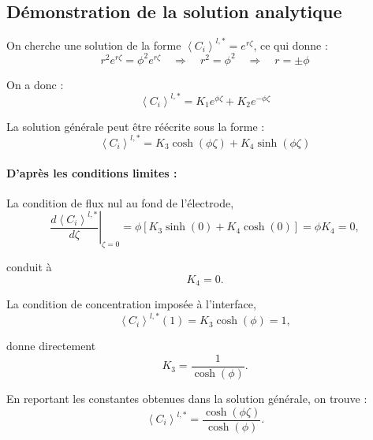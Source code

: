 \subsection*{Démonstration de la solution analytique}

On cherche une solution de la forme $\left\langle C_i \right\rangle^{l,*} = e^{r\zeta}$, ce qui donne :
\begin{equation*}
r^2 e^{r\zeta} = \phi^2 e^{r\zeta} \quad \Rightarrow \quad r^2 = \phi^2 \quad \Rightarrow \quad r = \pm\phi
\end{equation*}

On a donc :
\begin{equation*}
\left\langle C_i \right\rangle^{l,*} = K_1 e^{\phi\zeta} + K_2 e^{-\phi\zeta}
\end{equation*}

La solution générale peut être réécrite sous la forme :
\begin{equation*}
\left\langle C_i \right\rangle^{l,*}
=
K_3\cosh(\phi\zeta)
+
K_4\sinh(\phi\zeta)
\end{equation*}

\paragraph{D'après les conditions limites :}

La condition de flux nul au fond de l'électrode,
\begin{equation*}
\left.
\frac{d\left\langle C_i \right\rangle^{l,*}}{d\zeta}
\right|_{\zeta=0}
=
\phi\left[K_3\sinh(0) + K_4\cosh(0)\right]
=
\phi K_4
=
0,
\end{equation*}

conduit à
\begin{equation*}
K_4=0 .
\end{equation*}

La condition de concentration imposée à l'interface,
\begin{equation*}
\left\langle C_i \right\rangle^{l,*}(1)=K_3\cosh(\phi)=1,
\end{equation*}

donne directement
\begin{equation*}
K_3=\frac{1}{\cosh(\phi)} .
\end{equation*}

En reportant les constantes obtenues dans la solution générale, on trouve :
\begin{equation*}
\left\langle C_i \right\rangle^{l,*}
=
\frac{\cosh(\phi\zeta)}{\cosh(\phi)} .
\end{equation*}

